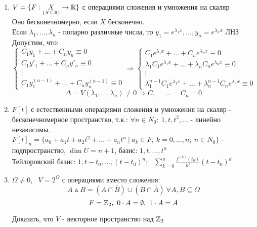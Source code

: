\begin{enumerate}
\begin{exercise}
    \end{exercise}
    \item $V = \{F:\underset{(X\subseteq \mathbb{R})}{X} \to \mathbb{R}\}$ с операциями сложения и умножения на скаляр\\
    Оно бесконечномерно, если $X$ бесконечно.\\
    Если $\lambda_1, ..., \lambda_n$ - попарно различные числа, то $y_1 = e^{\lambda_1x},..., y_n = e^{\lambda_nx}$ ЛНЗ\\
    Допустим, что:
    $$\begin{cases}
      C_1y_1 + ... + C_ny_n \equiv 0\\
      C_1y'_1 + ... + C_ny'_n \equiv 0\\
      \vdots\\
      C_1y_1^{(n-1)} + ... + C_ny_n^{(n-1)} \equiv 0
    \end{cases} \Longrightarrow 
    \begin{cases}
      C_1e^{\lambda_1x} + ... + C_ne^{\lambda_nx} \equiv 0\\
      \lambda_1C_1e^{\lambda_1x} + ... + \lambda_nC_ne^{\lambda_nx} \equiv 0\\
      \vdots\\
      \lambda_1^{n-1} C_1e^{\lambda_1x} + ... + \lambda_n^{n-1} C_ne^{\lambda_nx} \equiv 0
    \end{cases}$$
    $$\Delta = V(\lambda_1,...,\lambda_n) \neq 0 \Longrightarrow C_1 = ... = C_n = 0$$
    \item $F[t]$ с естественными операциями сложения и умножения на скаляр - бесконечномерное пространство, т.к.: $\forall n \in N_0: \ 1, t, t^2,...$ - линейно независимы.\\
    $F[t]_n = \{a_0+a_1t+a_2t^2+...+a_nt^n \ | \ a_k\in F, \ k=0,...,n; \ n \in N_0\} $ - подпространство, $\dim U = n+1$, базис: $1,t,...,t^n$\\
    Тейлоровский базис: $1, t-t_0,...,(t-t_0)^n$; \ $\sum \limits_{k=0}^n\frac{f^{(k)}(t_0)}{k!}(t-t_0)^k$ 
    \item $\varOmega \neq 0$, \ $V = 2^\varOmega $ с операциями вместо сложения:
    $$A\vartriangle B = (A\cap \overline{B}) \cup (B\cap \overline{A}) \ \forall A,B \subseteq \varOmega$$
    $$F = \mathbb{Z}_2,  \ 0\cdot A = \emptyset , \ 1 \cdot A = A$$
    \begin{exercise}
      Доказать, что $V$ - векторное пространство над $\mathbb{Z}_2$
    \end{exercise}   
  \end{enumerate}
